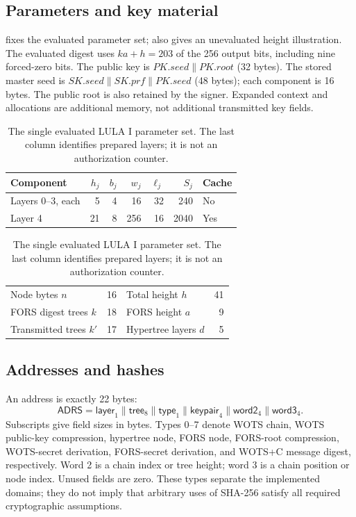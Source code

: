 \documentclass[a4paper,envcountsame,runningheads]{llncs}
\newcommand{\AD}{\mathsf{ADRS}}
\begin{document}
\subsection{Parameters and key material}
 fixes the evaluated parameter set;  also gives an unevaluated height illustration. The evaluated digest uses $ka+h=203$ of the 256 output bits, including nine forced-zero bits. The public key is $PK.seed\|PK.root$ (32 bytes). The stored master seed is $SK.seed\|SK.prf\|PK.seed$ (48 bytes); each component is 16 bytes. The public root is also retained by the signer. Expanded context and allocations are additional memory, not additional transmitted key fields.

\begin{table}[t]
\caption{The single evaluated LULA I parameter set. The last column identifies prepared layers; it is not an authorization counter.}\label{tab:params}
\centering\small
\begin{tabular}{lrrrrrl}\toprule
Component & $h_j$ & $b_j$ & $w_j$ & $\ell_j$ & $S_j$ & Cache\\\midrule
Layers 0--3, each &5&4&16&32&240&No\\
Layer 4 &21&8&256&16&2040&Yes\\\bottomrule
\end{tabular}

\smallskip
\begin{tabular}{lr@{\quad}lr}\toprule
Node bytes $n$&16&Total height $h$&41\\
FORS digest trees $k$&18&FORS height $a$&9\\
Transmitted trees $k'$&17&Hypertree layers $d$&5\\\bottomrule
\end{tabular}
\end{table}

\subsection{Addresses and hashes}\label{sec:hash}
An address is exactly 22 bytes:
\[
 \AD=\mathsf{layer}_1\|\mathsf{tree}_8\|\mathsf{type}_1
       \|\mathsf{keypair}_4\|\mathsf{word2}_4\|\mathsf{word3}_4.
\]
Subscripts give field sizes in bytes. Types 0--7 denote WOTS chain, WOTS public-key compression, hypertree node, FORS node, FORS-root compression, WOTS-secret derivation, FORS-secret derivation, and WOTS+C message digest, respectively. Word 2 is a chain index or tree height; word 3 is a chain position or node index. Unused fields are zero. These types separate the implemented domains; they do not imply that arbitrary uses of SHA-256 satisfy all required cryptographic assumptions.
\end{document}
